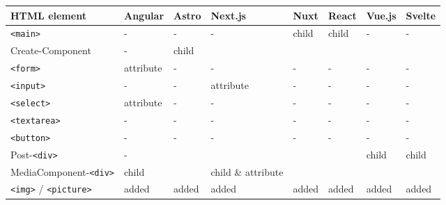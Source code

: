 \documentclass[a4paper, 10pt]{article}
\begin{document}
\begin{table}[!ht]
  \centering
  \begin{adjustbox}{angle=90}
    \begin{tabular}{|l|l|l|l|l|l|l|l|}
      \hline
      \textbf{HTML element}           & \textbf{Angular}  & \textbf{Astro}  & \textbf{Next.js}    & \textbf{Nuxt} & \textbf{React}  & \textbf{Vue.js} & \textbf{Svelte} \\ \hline
      \verb|<main>|                   & -                 & -               & -                   & child         & child           & -               & -               \\ \hline
      Create-Component                & -                 & child           & ~                   & ~             & ~               & ~               & ~               \\ \hline
      \verb|<form>|                   & attribute         & -               & -                   & -             & -               & -               & -               \\ \hline
      \verb|<input>|                  & -                 & -               & attribute           & -             & -               & -               & -               \\ \hline
      \verb|<select>|                 & attribute         & -               & -                   & -             & -               & -               & -               \\ \hline
      \verb|<textarea>|               & -                 & -               & -                   & -             & -               & -               & -               \\ \hline
      \verb|<button>|                 & -                 & -               & -                   & -             & -               & -               & -               \\ \hline
      Post-\verb|<div>|               & -                 & ~               & ~                   & ~             & ~               & child           & child           \\ \hline
      MediaComponent-\verb|<div>|     & child             & ~               & child \& attribute  & ~             & ~               & ~               & ~               \\ \hline
      \verb|<img>| / \verb|<picture>| & added             & added           & added               & added         & added           & added           & added           \\ \hline

\end{tabular}
\end{adjustbox}
\end{table}
\end{document}
